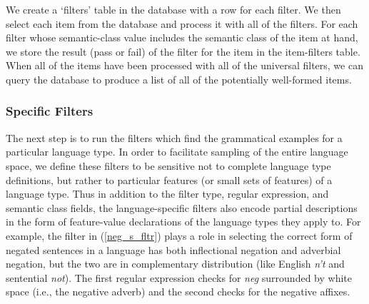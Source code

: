 \documentclass[11pt]{article}
\begin{document}
%
We create a `filters' table in the database with a row for each
filter.  We then select each item from the database and process it
with all of the filters.  For each filter whose semantic-class value
includes the semantic class of the item at hand, we store the result
(pass or fail) of the filter for the item in the item-filters table.
When all of the items have been processed with all of the universal
filters, we can query the database to produce a list of all of the
potentially well-formed items.

\subsubsection{Specific Filters}

The next step is to run the filters which find the grammatical
examples for a particular language type.  In order to facilitate
sampling of the entire language space, we define these filters to be
sensitive not to complete language type definitions, but rather to
particular features (or small sets of features) of a language type.
Thus in addition to the filter type, regular expression, and semantic
class fields, the language-specific filters also encode partial
descriptions in the form of feature-value declarations of the language
types they apply to.  For example, the filter in (\ref{neg_s_fltr})
plays a role in selecting the correct form of negated sentences in
a language has both inflectional negation and adverbial negation,
but the two are in complementary distribution (like English {\it n't}
and sentential {\it not}).  The first regular expression checks for
{\it neg} surrounded by white space (i.e., the negative adverb) and the
second checks for the negative affixes.
\end{document}
